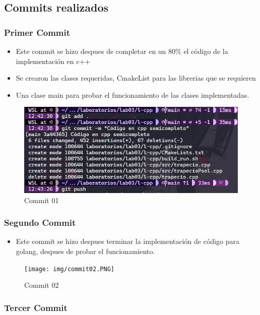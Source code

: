 \subsection {Commits realizados}

\subsubsection {Primer Commit}

\begin{itemize}
    \item Este commit se hizo despues de completar en un 80\% el código de la implementación en c++
    \item Se crearon las clases requeridas, CmakeList para las librerias que se requieren
    \item Una clase main para probar el funcionamiento de las clases implementadas.
\end{itemize}

\begin{figure}[H]
    \centering
    \includegraphics[width=0.8\linewidth]{img/commit01.png}
    \caption{Commit 01}
    \label{fig:placeholder}
\end{figure}


\subsubsection {Segundo Commit}

\begin{itemize}
    \item Este commit se hizo despues terminar la implementación de código para golang, despues de probar el funcionamiento.
\end{itemize}

\begin{figure}[H]
    \centering
    \texttt{[image: img/commit02.PNG]}
    \caption{Commit 02}
    \label{fig:placeholder}
\end{figure}


\subsubsection {Tercer Commit}


